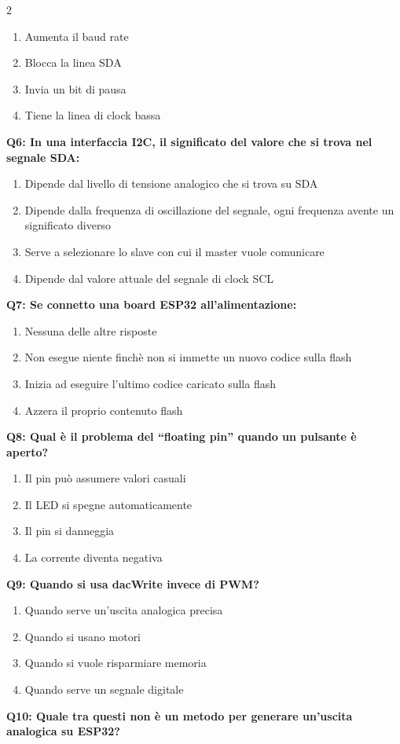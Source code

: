 \documentclass[10pt]{article}
\begin{document}
\begin{multicols}{2}
\begin{enumerate}[label=\arabic*.]
\item Aumenta il baud rate
\item Blocca la linea SDA
\item Invia un bit di pausa
\item Tiene la linea di clock bassa
\end{enumerate}
\textbf{Q6: In una interfaccia I2C, il significato del valore che si trova nel segnale SDA:}

\begin{enumerate}[label=\arabic*.]
\item Dipende dal livello di tensione analogico che si trova su SDA
\item Dipende dalla frequenza di oscillazione del segnale, ogni frequenza avente un significato diverso
\item Serve a selezionare lo slave con cui il master vuole comunicare
\item Dipende dal valore attuale del segnale di clock SCL
\end{enumerate}
\textbf{Q7: Se connetto una board ESP32 all'alimentazione:}

\begin{enumerate}[label=\arabic*.]
\item Nessuna delle altre risposte
\item Non esegue niente finchè non si immette un nuovo codice sulla flash
\item Inizia ad eseguire l'ultimo codice caricato sulla flash
\item Azzera il proprio contenuto flash
\end{enumerate}
\textbf{Q8: Qual è il problema del “floating pin” quando un pulsante è aperto?}

\begin{enumerate}[label=\arabic*.]
\item Il pin può assumere valori casuali
\item Il LED si spegne automaticamente
\item Il pin si danneggia
\item La corrente diventa negativa
\end{enumerate}
\textbf{Q9: Quando si usa dacWrite invece di PWM?}

\begin{enumerate}[label=\arabic*.]
\item Quando serve un’uscita analogica precisa
\item Quando si usano motori
\item Quando si vuole risparmiare memoria
\item Quando serve un segnale digitale
\end{enumerate}
\textbf{Q10: Quale tra questi non è un metodo per generare un’uscita analogica su ESP32?}


\end{multicols}
\end{document}
